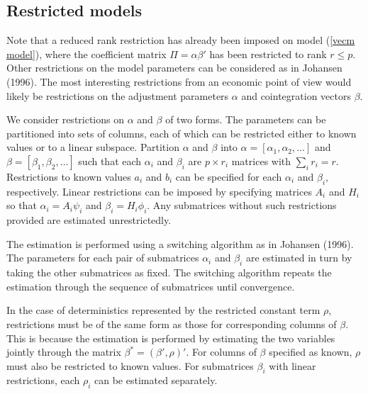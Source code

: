 \documentclass[12pt]{article}
\begin{document}
\subsection{Restricted models}

Note that a reduced rank restriction has already been imposed on model (\ref{vecm model}), where the coefficient matrix $\Pi  = \alpha \beta '$ has been restricted to rank $r \leq p$. Other restrictions on the model parameters can be considered as in Johansen (1996). The most interesting restrictions from an economic point of view would likely be restrictions on the adjustment parameters $\alpha$ and cointegration vectors $\beta$.

We consider restrictions on $\alpha$ and $\beta$ of two forms. The parameters can be partitioned into sets of columns, each of which can be restricted either to known values or to a linear subspace. 
Partition $\alpha$ and $\beta$ into $\alpha = [\alpha_1, \alpha_2, \dots]$ and $\beta = [\beta_1, \beta_2, \dots]$ such that each $\alpha_i$ and $\beta_i$ are $p \times r_i$ matrices with $\sum_i r_i = r$. 
Restrictions to known values $a_i$ and $b_i$ can be specified for each $\alpha_i$ and $\beta_i$, respectively. Linear restrictions can be imposed by specifying matrices $A_i$ and $H_i$ so that $\alpha_i = A_i \psi_i$ and $\beta_i = H_i \phi_i$.
Any submatrices without such restrictions provided are estimated unrestrictedly.


The estimation is performed using a switching algorithm as in Johansen (1996). The parameters for each pair of submatrices $\alpha_i$ and $\beta_i$ are estimated in turn by taking the other submatrices as fixed. The switching algorithm repeats the estimation through the sequence of submatrices until convergence.

In the case of deterministics represented by the restricted constant term $\rho$, restrictions must be of the same form as those for corresponding columns of $\beta$. This is because the estimation is performed by estimating the two variables jointly through the matrix $\beta^{*} = (\beta', \rho)'$. For columns of $\beta$ specified as known, $\rho$ must also be restricted to known values. 
For submatrices $\beta_i$ with linear restrictions, each $\rho_i$ can be estimated separately.
\end{document}

